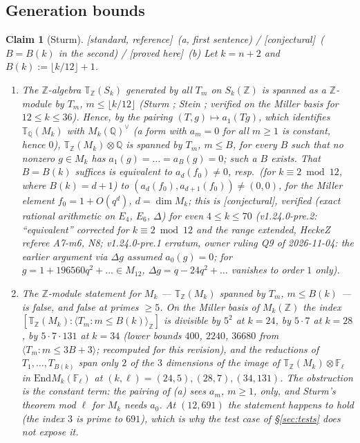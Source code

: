 \documentclass[11pt]{article}
\newtheorem{claim}[theorem]{Claim}
\theoremstyle{remark}
\newcommand{\F}{\mathbb{F}}
\newcommand{\Z}{\mathbb{Z}}
\newcommand{\Q}{\mathbb{Q}}
\newcommand{\End}{\mathrm{End}}
\newcommand{\De}{\Delta}
\newcommand{\Fl}{\F_\ell}
\newcommand{\T}{\mathbb{T}}
\newcommand{\PROVED}{\textsf{[proved here]}}
\newcommand{\STD}{\textsf{[standard, reference]}}
\newcommand{\CONJ}{\textsf{[conjectural]}}
\begin{document}
\subsection{Generation bounds}\label{sec:genbounds}
\begin{claim}[Sturm]\label{cl:sturm}\STD\ (a, first sentence) / \CONJ\ ($B=B(k)$ in the second) / \PROVED\ (b)
Let $k=n+2$ and $B(k):=\lfloor k/12\rfloor+1$.
\begin{enumerate}[label=(\alph*)]
\item The $\Z$-algebra $\T_\Z(S_k)$ generated by all $T_m$ on $S_k(\Z)$ is spanned as a
  $\Z$-module by $T_m$, $m\le\lfloor k/12\rfloor$ (Sturm \cite{sturm}; Stein \cite[\S9.4]{stein};
  verified on the Miller basis for $12\le k\le36$). Hence, by the pairing $(T,g)\mapsto a_1(Tg)$, which identifies $\T_\Q(M_k)$ with
  $M_k(\Q)^\vee$ (a form with $a_m=0$ for all $m\ge1$ is constant, hence $0$), $\T_\Z(M_k)\otimes\Q$ is spanned by $T_m$, $m\le B$, for
  every $B$ such that no nonzero $g\in M_k$ has $a_1(g)=\dots=a_B(g)=0$; such a $B$ exists. That $B=B(k)$ suffices is equivalent to
  $a_d(f_0)\ne0$, resp.\ (for $k\equiv2\bmod12$, where $B(k)=d+1$) to $(a_d(f_0),a_{d+1}(f_0))\ne(0,0)$, for the Miller element $f_0=1+O(q^{d})$, $d=\dim M_k$; this is
  \CONJ, verified (exact rational arithmetic on $E_4$, $E_6$, $\De$) for even $4\le k\le70$ (v1.24.0-pre.2: ``equivalent'' corrected for $k\equiv2\bmod12$ and the range
  extended, HeckeZ referee A7-m6, N8; v1.24.0-pre.1 erratum, owner ruling Q9 of 2026-11-04: the earlier argument via $\De g$ assumed $a_0(g)=0$; for
  $g=1+196560q^2+\dots\in M_{12}$, $\De g=q-24q^2+\dots$ vanishes to order $1$ only).
\item The $\Z$-module statement for $M_k$ --- $\T_\Z(M_k)$ spanned by $T_m$, $m\le B(k)$ --- is
  \emph{false}, and false at primes $\ge5$. On the Miller basis of $M_k(\Z)$ the index
  $[\T_\Z(M_k):\langle T_m:m\le B(k)\rangle_\Z]$ is divisible by $5^2$ at $k=24$, by $5\cdot7$ at
  $k=28$, by $5\cdot7\cdot131$ at $k=34$ (lower bounds $400$, $2240$, $36680$ from
  $\langle T_m:m\le3B+3\rangle$; recomputed for this revision), and the reductions of
  $T_1,\dots,T_{B(k)}$ span only $2$ of the $3$ dimensions of the image of $\T_\Z(M_k)\otimes\Fl$ in $\End M_k(\Fl)$
  at $(k,\ell)=(24,5),(28,7),(34,131)$. The obstruction is the constant term: the pairing of (a)
  sees $a_m$, $m\ge1$, only, and Sturm's theorem mod $\ell$ for $M_k$ needs $a_0$. At $(12,691)$
  the statement happens to hold (the index $3$ is prime to $691$), which is why the test case
  of \S\ref{sec:tests} does not expose it.
\end{enumerate}
\end{claim}
\end{document}

